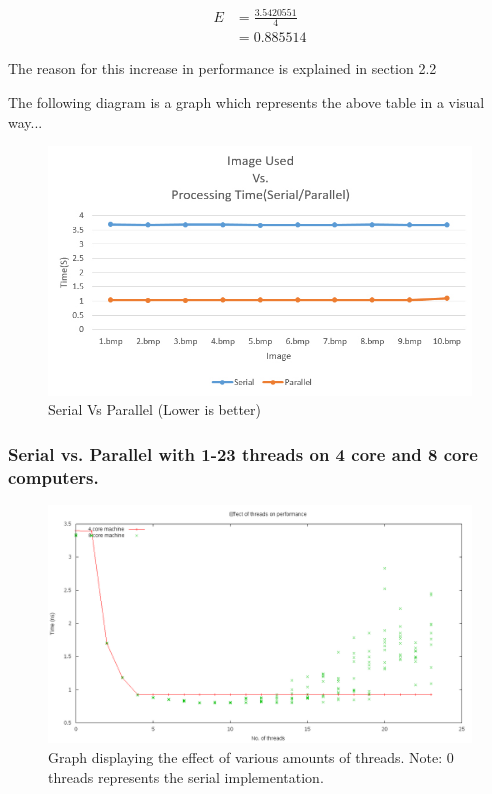 \documentclass[paper=a4, fontsize=11pt]{scrartcl} %
\numberwithin{equation}{section} %
\numberwithin{figure}{section} %
\numberwithin{table}{section} %
\begin{document}
\begin{equation}
\begin{split}
E &= \frac{3.5420551}{4}\\
	&= 0.885514
\end{split}
\end{equation}


The reason for this increase in performance is explained in section 2.2


The following diagram is a graph which represents the above table in a visual way...


\begin{figure}[H]
	\centering
	\includegraphics[scale=0.5]{"graph2"}
	\caption{Serial Vs Parallel (Lower is better)}
        \label{graph1}
\end{figure}

\subsubsection{Serial vs. Parallel with 1-23 threads on 4 core and 8 core computers.}

\begin{figure}[H]
	\centering
	\includegraphics[scale=0.5]{"threads"}
	\caption{Graph displaying the effect of various amounts of threads.
                 Note: 0 threads represents the serial implementation.}
        \label{threads}
\end{figure}
\end{document}
